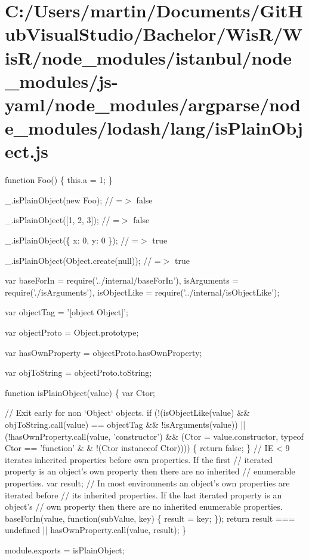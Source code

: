 \hypertarget{_c_1_2_users_2martin_2_documents_2_git_hub_visual_studio_2_bachelor_2_wis_r_2_wis_r_2node_modulef645361585b08d156caf203d50c7e75d}{}\section{C\+:/\+Users/martin/\+Documents/\+Git\+Hub\+Visual\+Studio/\+Bachelor/\+Wis\+R/\+Wis\+R/node\+\_\+modules/istanbul/node\+\_\+modules/js-\/yaml/node\+\_\+modules/argparse/node\+\_\+modules/lodash/lang/is\+Plain\+Object.\+js}
function Foo() \{ this.\+a = 1; \}

\+\_\+.\+is\+Plain\+Object(new Foo); // =$>$ false

\+\_\+.\+is\+Plain\+Object(\mbox{[}1, 2, 3\mbox{]}); // =$>$ false

\+\_\+.\+is\+Plain\+Object(\{ \textquotesingle{}x\textquotesingle{}\+: 0, \textquotesingle{}y\textquotesingle{}\+: 0 \}); // =$>$ true

\+\_\+.\+is\+Plain\+Object(Object.\+create(null)); // =$>$ true


\begin{DoxyCodeInclude}
var baseForIn = require(\textcolor{stringliteral}{'../internal/baseForIn'}),
    isArguments = require(\textcolor{stringliteral}{'./isArguments'}),
    isObjectLike = require(\textcolor{stringliteral}{'../internal/isObjectLike'});

var objectTag = \textcolor{stringliteral}{'[object Object]'};

var objectProto = Object.prototype;

var hasOwnProperty = objectProto.hasOwnProperty;

var objToString = objectProto.toString;

\textcolor{keyword}{function} isPlainObject(value) \{
  var Ctor;

  \textcolor{comment}{// Exit early for non `Object` objects.}
  \textcolor{keywordflow}{if} (!(isObjectLike(value) && objToString.call(value) == objectTag && !isArguments(value)) ||
      (!hasOwnProperty.call(value, \textcolor{stringliteral}{'constructor'}) && (Ctor = value.constructor, typeof Ctor == \textcolor{stringliteral}{'function'} &
      & !(Ctor instanceof Ctor)))) \{
    \textcolor{keywordflow}{return} \textcolor{keyword}{false};
  \}
  \textcolor{comment}{// IE < 9 iterates inherited properties before own properties. If the first}
  \textcolor{comment}{// iterated property is an object's own property then there are no inherited}
  \textcolor{comment}{// enumerable properties.}
  var result;
  \textcolor{comment}{// In most environments an object's own properties are iterated before}
  \textcolor{comment}{// its inherited properties. If the last iterated property is an object's}
  \textcolor{comment}{// own property then there are no inherited enumerable properties.}
  baseForIn(value, \textcolor{keyword}{function}(subValue, key) \{
    result = key;
  \});
  \textcolor{keywordflow}{return} result === undefined || hasOwnProperty.call(value, result);
\}

module.exports = isPlainObject;
\end{DoxyCodeInclude}
 